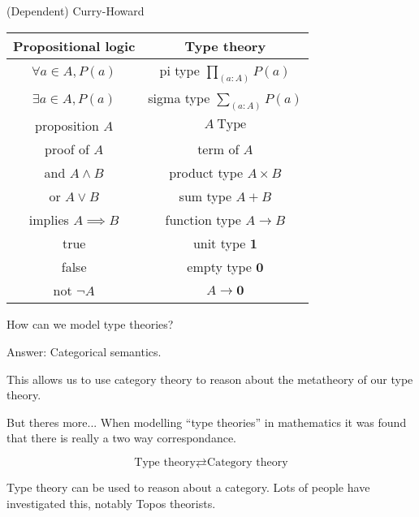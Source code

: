 \documentclass[usenames,dvipsnames]{beamer}
\begin{document}
    
    \begin{frame}{(Dependent) Curry-Howard}
        \begin{table}
            \begin{tabular}{c || c}
                \textbf{Propositional logic} & \textbf{Type theory} \\
                \hline\hline
                $\forall a \in A, P(a)$ & pi type $\prod_{(a : A)}P(a)$     \\
                $\exists a \in A, P(a)$ & sigma type $\sum_{(a:A)}P(a)$     \\
                proposition $A$         & $A\ \text{Type}$                  \\
                proof of $A$            & term of $A$                       \\
                and $A \land B$         & product type $A \times B$         \\
                or $A \lor B$           & sum type $A + B$                  \\
                implies $A \implies B$  & function type $A \to B$           \\
                true                    & unit type $\mathbf{1}$            \\
                false                   & empty type $\mathbf{0}$           \\
                not $¬A$                & $A \to \mathbf{0}$                \\
            \end{tabular}
        \end{table}
    \end{frame}
    
    \begin{frame}{How can we model type theories?}
        \begin{block}{Answer:}
            Categorical semantics.
        \end{block}
        This allows us to use category theory to reason about the metatheory of our type theory.
        
        \begin{block}{But theres more...}
            When modelling ``type theories'' in mathematics it was found that there is really a two way correspondance.
            
            $$\text{Type theory} \rightleftarrows \text{Category theory}$$
            
            Type theory can be used to reason about a category. Lots of people have investigated this, notably Topos theorists.
        \end{block}
        
    \end{frame}
    
\end{document}
